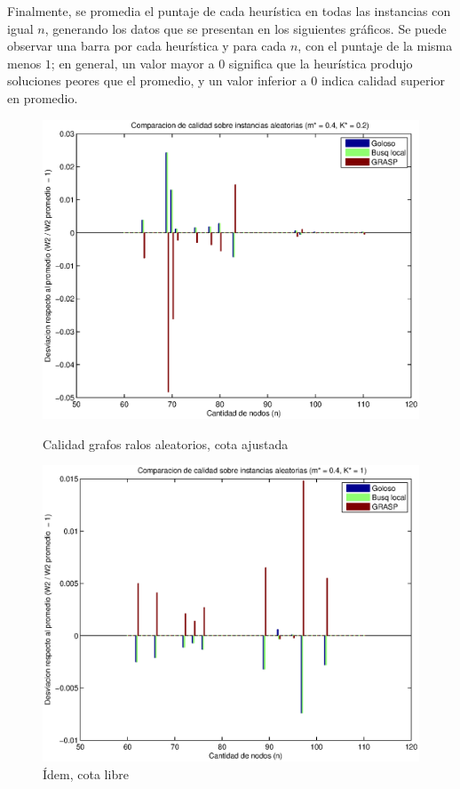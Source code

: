Finalmente, se promedia el puntaje de cada heurística en todas las instancias con igual $n$, generando los datos que se presentan en los siguientes gráficos. Se puede observar una barra por cada heurística y para cada $n$, con el puntaje de la misma menos $1$; en general, un valor mayor a 0 significa que la heurística produjo soluciones peores que el promedio, y un valor inferior a 0 indica calidad superior en promedio.


\begin{figure}[H]
    \begin{minipage}{0.5\linewidth}
      \includegraphics[width=\linewidth]{graficos/todos_calidad_m04_K02.eps}
      \caption{Calidad grafos ralos aleatorios, cota ajustada}\label{fig:ralos-ajustada}
    \end{minipage}
    \hfill
    \begin{minipage}{0.5\linewidth}
      \includegraphics[width=\linewidth]{graficos/todos_calidad_m04_K1.eps}
      \caption{Ídem, cota libre}\label{fig:ralos-libre}
    \end{minipage}    
\end{figure}

